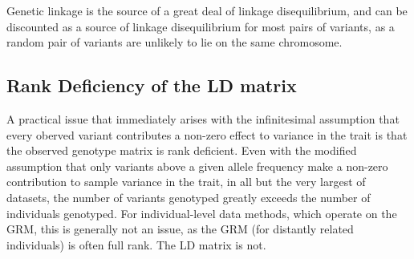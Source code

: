 Genetic linkage is the source of a great deal of linkage disequilibrium, and can be discounted as a source of linkage disequilibrium for most pairs of variants, as a random pair of variants are unlikely to lie on the same chromosome.  

\subsection{Rank Deficiency of the LD matrix}\label{sec:org48c0ea3}

A practical issue that immediately arises with the infinitesimal assumption that every oberved variant contributes a non-zero effect to variance in the trait is that the observed genotype matrix is rank deficient.
Even with the modified assumption that only variants above a given allele frequency make a non-zero contribution to sample variance in the trait, in all but the very largest of datasets, the number of variants genotyped greatly
exceeds the number of individuals genotyped.  For individual-level data methods, which operate on the GRM, this is generally not an issue, as the GRM (for distantly related individuals) is often full rank.  The LD matrix is not.




